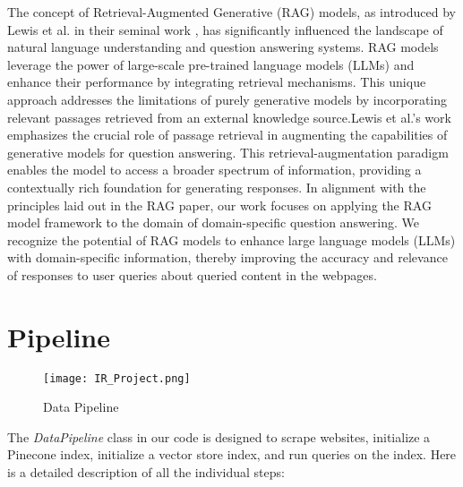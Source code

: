 \documentclass[sigconf,natbib=true,anonymous=false]{acmart}
\begin{document}
The concept of Retrieval-Augmented Generative (RAG) models, as introduced by Lewis et al. in their seminal work \cite{DBLP:journals/corr/abs-2005-11401}, has significantly influenced the landscape of natural language understanding and question answering systems. RAG models leverage the power of large-scale pre-trained language models (LLMs) and enhance their performance by integrating retrieval mechanisms. This unique approach addresses the limitations of purely generative models by incorporating relevant passages retrieved from an external knowledge source.Lewis et al.'s work emphasizes the crucial role of passage retrieval in augmenting the capabilities of generative models for question answering. This retrieval-augmentation paradigm enables the model to access a broader spectrum of information, providing a contextually rich foundation for generating responses.
In alignment with the principles laid out in the RAG paper, our work focuses on applying the RAG model framework to the domain of domain-specific question answering. We recognize the potential of RAG models to enhance large language models (LLMs) with domain-specific information, thereby improving the accuracy and relevance of responses to user queries about queried content in the webpages.


\section{Pipeline}

\begin{figure*}[h]
    \centering
    \texttt{[image: IR\_Project.png]}
    \caption{Data Pipeline}
    \label{fig:enter-label}
\end{figure*}

The \textit{DataPipeline} class in our code is designed to scrape websites, initialize a Pinecone index, initialize a vector store index, and run queries on the index. Here is a detailed description of all the individual steps:
\end{document}

